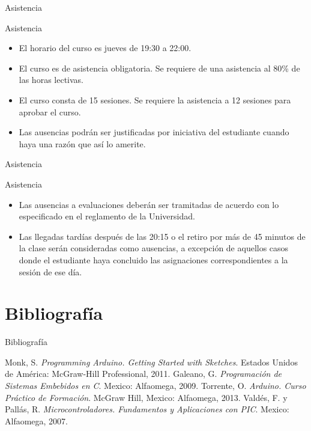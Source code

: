 \documentclass[handout,xcolor=dvipsnames]{beamer}
\newcommand{\pageframe}[1]{\frame{\begin{center}{ \Huge #1 }\end{center}}}
\begin{document}
\begin{frame}{Asistencia}
\begin{block}{Asistencia}
  \begin{itemize}[<+->]
  	\item El horario del curso es jueves de 19:30 a 22:00.
    \item El curso es de asistencia obligatoria. Se requiere de una asistencia al 80\% de las horas lectivas.
    \item El curso consta de 15 sesiones. Se requiere la asistencia a 12 sesiones para aprobar el curso.
    \item Las ausencias podrán ser justificadas por iniciativa del estudiante cuando haya una razón que así lo amerite.
  \end{itemize}
\end{block}
\end{frame}

\begin{frame}{Asistencia}
\begin{block}{Asistencia}
  \begin{itemize}[<+->]
	\item Las ausencias a evaluaciones deberán ser tramitadas de acuerdo con lo especificado en el reglamento de la Universidad.
    \item Las llegadas tardías después de las 20:15 o el retiro por más de 45 minutos de la clase serán consideradas como ausencias, a excepción de aquellos casos donde el estudiante haya concluido las asignaciones correspondientes a la sesión de ese día.
  \end{itemize}
\end{block}
\end{frame}


\section{Bibliografía}

\pageframe{Bibliografía}
\nocite{*}

\begin{frame}{Bibliografía}

\begin{thebibliography}{5}
  Monk, S.
  \textit{Programming Arduino. Getting Started with Sketches}.
  Estados Unidos de América: McGraw-Hill Professional,
  2011.
  Galeano, G.
  \textit{Programación de Sistemas Embebidos en C}.
  Mexico: Alfaomega,
  2009.
  Torrente, O.
  \textit{Arduino. Curso Práctico de Formación}.
  McGraw Hill,
  Mexico: Alfaomega,
  2013.
  Valdés, F. y Pallás, R.
  \textit{Microcontroladores. Fundamentos y Aplicaciones con PIC}.
  Mexico: Alfaomega,
  2007.
\end{thebibliography}

\end{frame}
\end{document}
